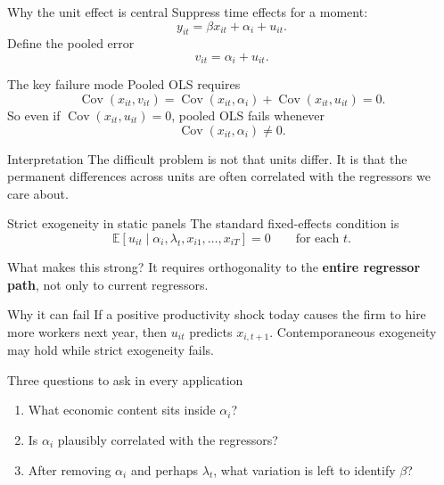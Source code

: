 \documentclass[10pt]{beamer}
\DeclareMathOperator{\Cov}{Cov}
\newcommand{\E}{\mathbb{E}}
\begin{document}
\begin{frame}{Why the unit effect is central}
\label{slide:alpha}
\small
Suppress time effects for a moment:
\[
y_{it} = \beta x_{it} + \alpha_i + u_{it}.
\]
Define the pooled error
\[
v_{it} = \alpha_i + u_{it}.
\]

\pause
\begin{block}{The key failure mode}
Pooled OLS requires
\[
\Cov(x_{it}, v_{it}) = \Cov(x_{it}, \alpha_i) + \Cov(x_{it}, u_{it}) = 0.
\]
So even if $\Cov(x_{it}, u_{it}) = 0$, pooled OLS fails whenever
\[
\Cov(x_{it}, \alpha_i) \neq 0.
\]
\end{block}

\pause
\begin{alertblock}{Interpretation}
The difficult problem is not that units differ. It is that the permanent differences across units are often correlated with the regressors we care about.
\end{alertblock}
\end{frame}

\begin{frame}{Strict exogeneity in static panels}
\label{slide:strictexog}
\small
The standard fixed-effects condition is
\[
\E[u_{it} \mid \alpha_i, \lambda_t, x_{i1}, \ldots, x_{iT}] = 0
\qquad \text{for each } t.
\]

\begin{block}{What makes this strong?}
It requires orthogonality to the \textbf{entire regressor path}, not only to current regressors.
\end{block}

\pause
\begin{exampleblock}{Why it can fail}
If a positive productivity shock today causes the firm to hire more workers next year, then $u_{it}$ predicts $x_{i,t+1}$. Contemporaneous exogeneity may hold while strict exogeneity fails.
\end{exampleblock}

\pause
\begin{alertblock}{Three questions to ask in every application}
\begin{enumerate}
  \item What economic content sits inside $\alpha_i$?
  \item Is $\alpha_i$ plausibly correlated with the regressors?
  \item After removing $\alpha_i$ and perhaps $\lambda_t$, what variation is left to identify $\beta$?
\end{enumerate}
\end{alertblock}
\end{frame}
\end{document}
